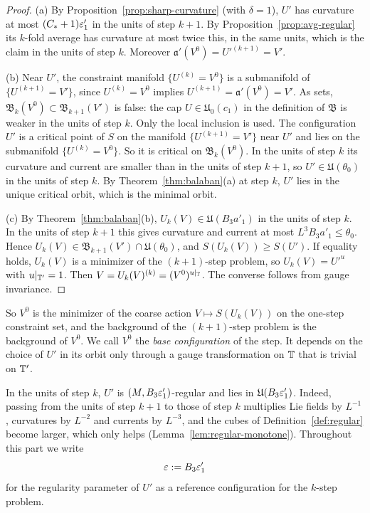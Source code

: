 \begin{proof}
(a) By Proposition~\ref{prop:sharp-curvature} (with $\delta=1$), $U'$ has curvature at most $(C_*+1)\varepsilon'_1$ in the units of step $k+1$. By Proposition~\ref{prop:avg-regular} its $k$-fold average has curvature at most twice this, in the same units, which is the claim in the units of step $k$. Moreover $\mathfrak a'(V^0)=U'^{(k+1)}=V'$.

(b) Near $U'$, the constraint manifold $\{U^{(k)}=V^0\}$ is a submanifold of $\{U^{(k+1)}=V'\}$, since $U^{(k)}=V^0$ implies $U^{(k+1)}=\mathfrak a'(V^0)=V'$. As sets, $\mathfrak B_k(V^0)\subset\mathfrak B_{k+1}(V')$ is false: the cap $U\in\mathfrak U_0(c_1)$ in the definition of $\mathfrak B$ is weaker in the units of step $k$. Only the local inclusion is used. The configuration $U'$ is a critical point of $S$ on the manifold $\{U^{(k+1)}=V'\}$ near $U'$ and lies on the submanifold $\{U^{(k)}=V^0\}$. So it is critical on $\mathfrak B_k(V^0)$. In the units of step $k$ its curvature and current are smaller than in the units of step $k+1$, so $U'\in\mathfrak U(\theta_0)$ in the units of step $k$. By Theorem~\ref{thm:balaban}(a) at step $k$, $U'$ lies in the unique critical orbit, which is the minimal orbit.

(c) By Theorem~\ref{thm:balaban}(b), $U_k(V)\in\mathfrak U(B_3a'_1)$ in the units of step $k$. In the units of step $k+1$ this gives curvature and current at most $L^3B_3a'_1\le\theta_0$. Hence $U_k(V)\in\mathfrak B_{k+1}(V')\cap\mathfrak U(\theta_0)$, and $S(U_k(V))\ge S(U')$. If equality holds, $U_k(V)$ is a minimizer of the $(k+1)$-step problem, so $U_k(V)=U'^{u}$ with $u|_{\mathbb T'}=1$. Then $V=U_k(V)^{(k)}=(V^0)^{u|_\mathbb T}$. The converse follows from gauge invariance.
\end{proof}

So $V^0$ is the minimizer of the coarse action $V\mapsto S(U_k(V))$ on the one-step constraint set, and the background of the $(k+1)$-step problem is the background of $V^0$. We call $V^0$ the \emph{base configuration} of the step. It depends on the choice of $U'$ in its orbit only through a gauge transformation on $\mathbb T$ that is trivial on $\mathbb T'$.

In the units of step $k$, $U'$ is $(M,B_3\varepsilon'_1)$-regular and lies in $\mathfrak U(B_3\varepsilon'_1)$. Indeed, passing from the units of step $k+1$ to those of step $k$ multiplies Lie fields by $L^{-1}$, curvatures by $L^{-2}$ and currents by $L^{-3}$, and the cubes of Definition~\ref{def:regular} become larger, which only helps (Lemma~\ref{lem:regular-monotone}). Throughout this part we write
\[
\varepsilon:=B_3\varepsilon'_1
\]
for the regularity parameter of $U'$ as a reference configuration for the $k$-step problem.
